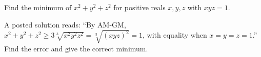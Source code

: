 Find the minimum of $x^2+y^2+z^2$ for positive reals $x,y,z$ with $xyz=1$.

A posted solution reads: ``By AM-GM, $x^2+y^2+z^2\ge3\sqrt[3]{x^2y^2z^2}=\sqrt[3]{(xyz)^2}=1$, with equality when $x=y=z=1$.'' Find the error and give the correct minimum.
